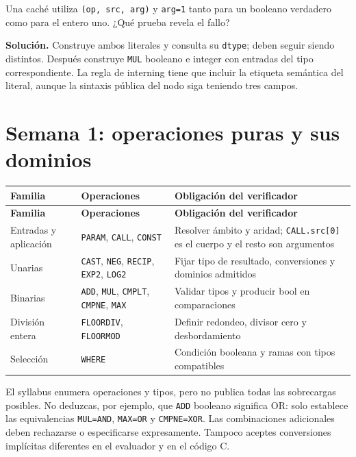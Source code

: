 \documentclass[12pt,a4paper,oneside]{report}
\begin{document}
\begin{practica}
Una caché utiliza \texttt{(op, src, arg)} y \texttt{arg=1} tanto para un booleano verdadero como para el entero uno. ¿Qué prueba revela el fallo?

\textbf{Solución.} Construye ambos literales y consulta su \texttt{dtype}; deben seguir siendo distintos. Después construye \texttt{MUL} booleano e integer con entradas del tipo correspondiente. La regla de interning tiene que incluir la etiqueta semántica del literal, aunque la sintaxis pública del nodo siga teniendo tres campos.

\end{practica}
\section{Semana 1: operaciones puras y sus dominios}
{\small
\begin{longtable}{@{}P{0.28\textwidth}P{0.32\textwidth}P{0.34\textwidth}@{}}
\toprule
\textbf{Familia} & \textbf{Operaciones} & \textbf{Obligación del verificador}\\
\midrule
\endfirsthead
\toprule
\textbf{Familia} & \textbf{Operaciones} & \textbf{Obligación del verificador}\\
\midrule
\endhead
Entradas y aplicación & \texttt{PARAM}, \texttt{CALL}, \texttt{CONST} & Resolver ámbito y aridad; \texttt{CALL.src[0]} es el cuerpo y el resto son argumentos\\
Unarias & \texttt{CAST}, \texttt{NEG}, \texttt{RECIP}, \texttt{EXP2}, \texttt{LOG2} & Fijar tipo de resultado, conversiones y dominios admitidos\\
Binarias & \texttt{ADD}, \texttt{MUL}, \texttt{CMPLT}, \texttt{CMPNE}, \texttt{MAX} & Validar tipos y producir bool en comparaciones\\
División entera & \texttt{FLOORDIV}, \texttt{FLOORMOD} & Definir redondeo, divisor cero y desbordamiento\\
Selección & \texttt{WHERE} & Condición booleana y ramas con tipos compatibles\\
\bottomrule
\end{longtable}
}
El syllabus enumera operaciones y tipos, pero no publica todas las sobrecargas posibles. No deduzcas, por ejemplo, que \texttt{ADD} booleano significa OR: solo establece las equivalencias \texttt{MUL=AND}, \texttt{MAX=OR} y \texttt{CMPNE=XOR}. Las combinaciones adicionales deben rechazarse o especificarse expresamente. Tampoco aceptes conversiones implícitas diferentes en el evaluador y en el código C.
\end{document}
